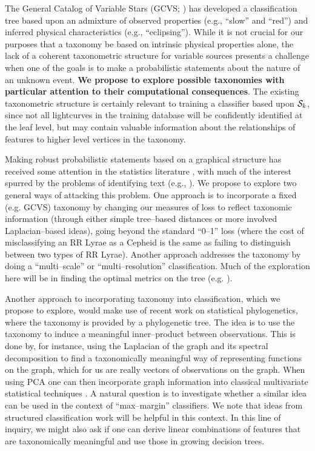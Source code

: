 The General Catalog of Variable Stars (GCVS; \citealt{ksf+96}) has developed a
classification tree based upon an admixture of observed properties (e.g.,
``slow'' and ``red'') and inferred physical characteristics (e.g.,
``eclipsing'').  While it is not crucial for our purposes that a taxonomy be
based on intrinsic physical properties alone, the lack of a coherent
taxonometric structure for variable sources presents a challenge when one of the
goals is to make a probabilistic statements about the nature of an unknown
event. {\bf We propose to explore possible taxonomies with particular attention
to their computational consequences}.  The existing taxonometric structure is
certainly relevant to training a classifier based upon ${\cal S}_k$, since not
all lightcurves in the training database will be confidently identified at the
leaf level, but may contain valuable information about the relationships of
features to higher level vertices in the taxonomy.

Making robust probabilistic statements based on a graphical structure has
received some attention in the statistics literature
\citep{DBLP:conf/icml/KollerS97,DBLP:conf/icdm/SunL01,DBLP:conf/icml/DekelKS04,
CesaBianchi06,  bcmt-lmmsc-04}, with much of the interest spurred by the
problems of identifying text (e.g., \citealt{593971}). We propose to explore two
general ways of attacking this problem. One approach is to incorporate a fixed
(e.g. GCVS) taxonomy by changing our measures of loss to reflect taxonomic
information (through either simple tree--based distances or more involved
Laplacian--based ideas), going beyond the standard ``0--1'' loss (where the cost
of misclassifying an RR Lyrae as a Cepheid is the same as failing to distinguish
between two types of RR Lyrae).  Another approach addresses the taxonomy by
doing a ``multi--scale'' or ``multi--resolution'' classification.  Much of the
exploration here will be in finding the optimal metrics on the tree (e.g.
\citealt{ChungSpectralGraphTheoryBook97}).

Another approach to incorporating taxonomy into classification, which we propose
to explore, would make use of recent work on statistical phylogenetics, where
the taxonomy is provided by a phylogenetic tree\citep{elithesis}.  The idea is
to use the taxonomy to induce a meaningful inner--product between observations.
This is done by, for instance, using the Laplacian of the graph and its spectral
decomposition to find a taxonomically meaningful way of representing functions
on the graph, which for us are really vectors of observations on the graph. When
using PCA one can then incorporate graph information into classical multivariate
statistical techniques \citep{PurdomAnalyzingDataWithGraphs08}.  A natural
question is to investigate whether a similar idea can be used in the context of
``max--margin'' classifiers. We note that ideas from structured classification
work \citep{bcmt-lmmsc-04} will be helpful in this context. In this line of
inquiry, we might also ask if one can derive linear combinations of features
that are taxonomically meaningful and use those in growing decision trees.


